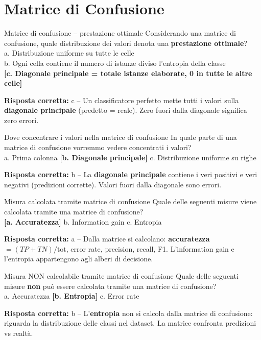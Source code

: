 \documentclass[12pt,a4paper]{article}
\newcommand{\corr}[1]{\textcolor{green!55!black}{\textbf{[#1]}}}
\newcommand{\risp}[1]{\begin{abox}\textbf{Risposta corretta: }#1\end{abox}}
\begin{document}
\section{Matrice di Confusione}

\begin{qbox}{Matrice di confusione -- prestazione ottimale}
Considerando una matrice di confusione, quale distribuzione dei valori denota una
\textbf{prestazione ottimale}?
\\[4pt]
a. Distribuzione uniforme su tutte le celle\\
b. Ogni cella contiene il numero di istanze diviso l'entropia della classe\\
\corr{c. Diagonale principale = totale istanze elaborate, 0 in tutte le altre celle}
\end{qbox}
\risp{c -- Un classificatore perfetto mette tutti i valori sulla \textbf{diagonale principale} (predetto = reale). Zero fuori dalla diagonale significa zero errori.}

\bigskip
\begin{qbox}{Dove concentrare i valori nella matrice di confusione}
In quale parte di una matrice di confusione vorremmo vedere concentrati i valori?
\\[4pt]
a. Prima colonna \quad \corr{b. Diagonale principale} \quad c. Distribuzione uniforme su righe
\end{qbox}
\risp{b -- La \textbf{diagonale principale} contiene i veri positivi e veri negativi (predizioni corrette). Valori fuori dalla diagonale sono errori.}

\bigskip
\begin{qbox}{Misura calcolata tramite matrice di confusione}
Quale delle seguenti misure viene calcolata tramite una matrice di confusione?
\\[4pt]
\corr{a. Accuratezza} \quad b. Information gain \quad c. Entropia
\end{qbox}
\risp{a -- Dalla matrice si calcolano: \textbf{accuratezza} $= (TP+TN)/\text{tot}$, error rate, precision, recall, F1. L'information gain e l'entropia appartengono agli alberi di decisione.}

\bigskip
\begin{qbox}{Misura NON calcolabile tramite matrice di confusione}
Quale delle seguenti misure \textbf{non} può essere calcolata tramite una matrice di confusione?
\\[4pt]
a. Accuratezza \quad \corr{b. Entropia} \quad c. Error rate
\end{qbox}
\risp{b -- L'\textbf{entropia} non si calcola dalla matrice di confusione: riguarda la distribuzione delle classi nel dataset. La matrice confronta predizioni vs realtà.}
\end{document}
